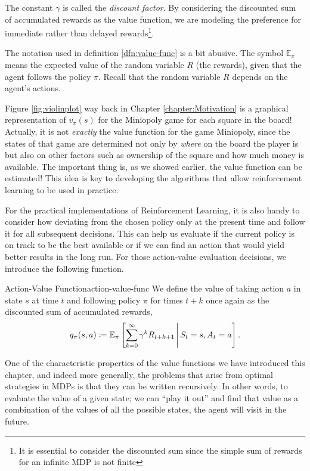 The constant $\gamma$ is called the \textit{discount factor}. By considering the
discounted sum of accumulated rewards as the value function, we are modeling the
preference for immediate rather than delayed rewards\footnote{It is essential to
consider the discounted sum since the simple sum of rewards for an infinite MDP
is not finite}. 

The notation used in definition \ref{dfn:value-func} is a bit abusive. The
symbol $\mathbb{E}_{\pi}$ means the expected value of the random variable $R$
(the rewards), given that the agent follows the policy $\pi$. Recall that the
random variable $R$ depends on the agent's actions.

Figure \ref{fig:violinplot} way back in Chapter \ref{chapter:Motivation} is
a graphical representation of $v_\pi (s)$ for the Miniopoly game for each square
in the board! Actually, it is not \textit{exactly} the value function for the
game Miniopoly, since the states of that game are determined not only by
\textit{where} on the board the player is but also on other factors such as
ownership of the square and how much money is available. The important thing is,
as we showed earlier, the value function can be estimated! This idea is key to
developing the algorithms that allow reinforcement learning to be used in
practice.

For the practical implementations of Reinforcement Learning, it is also handy to
consider how deviating from the chosen policy only at the present time and
follow it for all subsequent decisions. This can help us evaluate if the current
policy is on track to be the best available or if we can find an action that
would yield better results in the long run. For those action-value evaluation
decisions, we introduce the following function.

\begin{dfn}{Action-Value Function}{action-value-func}
	We define the value of taking action $a$ in state $s$ at time $t$ and
	following policy $\pi$ for times $t+k$ once again as the discounted sum of
	accumulated rewards,
	\begin{equation*}
		q_\pi (s, a) \coloneqq \mathbb{E}_{\pi} \left[ \sum_{k=0}^{\infty} \gamma^{k} R_{t+k+1} \,\middle\vert\, S_t = s, A_t = a \right].
	\end{equation*}
\end{dfn}

One of the characteristic properties of the value functions we have introduced
this chapter, and indeed more generally, the problems that arise from optimal
strategies in MDPs is that they can be written recursively. In other words, to
evaluate the value of a given state; we can ``play it out'' and find that value
as a combination of the values of all the possible states, the agent will visit in
the future.

